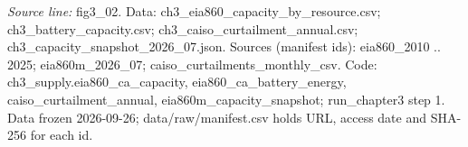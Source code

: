 {\scriptsize\textit{Source line:} fig3\_\allowbreak{}02. Data: ch3\_\allowbreak{}eia860\_\allowbreak{}capacity\_\allowbreak{}by\_\allowbreak{}resource.csv; ch3\_\allowbreak{}battery\_\allowbreak{}capacity.csv; ch3\_\allowbreak{}caiso\_\allowbreak{}curtailment\_\allowbreak{}annual.csv; ch3\_\allowbreak{}capacity\_\allowbreak{}snapshot\_\allowbreak{}2026\_\allowbreak{}07.json. Sources (manifest ids): eia860\_\allowbreak{}2010 .. 2025; eia860m\_\allowbreak{}2026\_\allowbreak{}07; caiso\_\allowbreak{}curtailments\_\allowbreak{}monthly\_\allowbreak{}csv. Code: ch3\_\allowbreak{}supply.eia860\_\allowbreak{}ca\_\allowbreak{}capacity, eia860\_\allowbreak{}ca\_\allowbreak{}battery\_\allowbreak{}energy, caiso\_\allowbreak{}curtailment\_\allowbreak{}annual, eia860m\_\allowbreak{}capacity\_\allowbreak{}snapshot; run\_\allowbreak{}chapter3 step 1. Data frozen 2026-09-26; data/raw/manifest.csv holds URL, access date and SHA-256 for each id.}